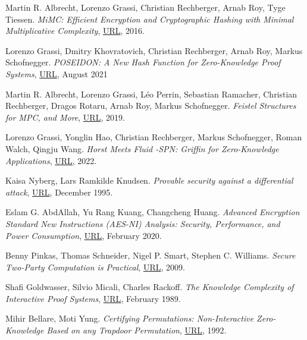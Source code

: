 \documentclass{Resources/UoBLab1}
\theoremstyle{definition}
\begin{document}
\setlength{\labelsep}{10pt} %
\begin{thebibliography}{10}
 Martin R. Albrecht, Lorenzo Grassi, Christian Rechberger, Arnab Roy, Tyge Tiessen. \textit{MiMC: Efficient Encryption and Cryptographic Hashing with Minimal Multiplicative Complexity}, \href{https://eprint.iacr.org/2016/492.pdf}{URL}, 2016.

 Lorenzo Grassi, Dmitry Khovratovich, Christian Rechberger, Arnab Roy, Markus Schofnegger. \textit{POSEIDON: A New Hash Function for Zero-Knowledge Proof Systems}, \href{https://www.usenix.org/system/files/sec21-grassi.pdf}{URL}, August 2021

 Martin R. Albrecht, Lorenzo Grassi, Léo Perrin, Sebastian Ramacher, Christian Rechberger, Dragos Rotaru, Arnab Roy, Markus Schofnegger. \textit{Feistel Structures for MPC, and More}, \href{https://eprint.iacr.org/2019/397.pdf}{URL}, 2019.

 Lorenzo Grassi, Yonglin Hao, Christian Rechberger, Markus Schofnegger, Roman Walch, Qingju Wang. \textit{Horst Meets Fluid -SPN: Griffin for Zero-Knowledge Applications}, \href{https://eprint.iacr.org/2022/403.pdf}{URL}, 2022.

 Kaisa Nyberg, Lars Ramkilde Knudsen. \textit{Provable security against a differential attack}, \href{https://link.springer.com/article/10.1007/BF00204800}{URL}, December 1995.

 Eslam G. AbdAllah, Yu Rang Kuang, Changcheng Huang. \textit{Advanced Encryption Standard New Instructions (AES-NI) Analysis: Security, Performance, and Power Consumption}, \href{https://www.sce.carleton.ca/faculty/huang/iccae-2020.pdf}{URL}, February 2020.

 Benny Pinkas, Thomas Schneider, Nigel P. Smart, Stephen C. Williams. \textit{Secure Two-Party Computation is Practical}, \href{https://eprint.iacr.org/2009/314.pdf}{URL}, 2009.

 Shafi Goldwasser, Silvio Micali, Charles Rackoff. \textit{The Knowledge Complexity of Interactive Proof Systems}, \href{https://people.csail.mit.edu/silvio/Selected%20Scientific%20Papers/Proof%20Systems/The_Knowledge_Complexity_Of_Interactive_Proof_Systems.pdf}{URL}, February 1989.

 Mihir Bellare, Moti Yung. \textit{Certifying Permutations: Non-Interactive Zero-Knowledge Based on any Trapdoor Permutation}, \href{https://cseweb.ucsd.edu/~mihir/papers/cct.pdf}{URL}, 1992.


\end{thebibliography}
\end{document}
